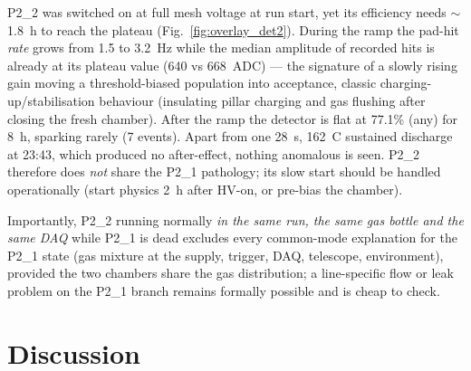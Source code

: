 \documentclass[11pt,a4paper]{article}
\newcommand{\detone}{P2\_1}
\newcommand{\dettwo}{P2\_2}
\begin{document}
\dettwo{} was switched on at full mesh voltage at run start, yet its
efficiency needs $\sim$1.8~h to reach the plateau
(Fig.~\ref{fig:overlay_det2}). During the ramp the pad-hit \emph{rate}
grows from 1.5 to 3.2~Hz while the median amplitude of recorded hits is
already at its plateau value (640 vs 668~ADC) --- the signature of a slowly
rising gain moving a threshold-biased population into acceptance, classic
charging-up/stabilisation behaviour (insulating pillar charging and gas
flushing after closing the fresh chamber). After the ramp the detector is
flat at 77.1\% (any) for 8~h, sparking rarely (7 events). Apart from one
28~s, 162~\textmu C sustained discharge at 23:43, which produced no
after-effect, nothing anomalous is seen. \dettwo{} therefore does
\emph{not} share the \detone{} pathology; its slow start should be handled
operationally (start physics 2~h after HV-on, or pre-bias the chamber).

Importantly, \dettwo{} running normally \emph{in the same run, the same gas
bottle and the same DAQ} while \detone{} is dead excludes every common-mode
explanation for the \detone{} state (gas mixture at the supply, trigger,
DAQ, telescope, environment), provided the two chambers share the gas
distribution; a line-specific flow or leak problem on the \detone{} branch
remains formally possible and is cheap to check.

\section{Discussion}
\label{sec:discussion}
\end{document}
